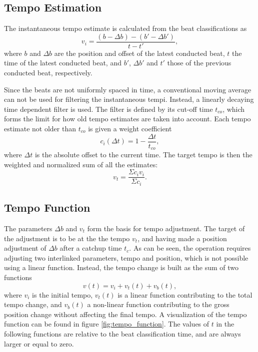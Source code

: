 \subsection{Tempo Estimation}

The instantaneous tempo estimate is calculated from
the beat classifications as
\begin{equation}
v_i = \frac{(b - \Delta b) - (b' - \Delta b')}{t - t'},
\end{equation}
where $b$ and $\Delta b$ are the position and offset of
the latest conducted beat,
$t$ the time of the latest conducted beat,
and $b'$, $\Delta b'$ and $t'$ those of
the previous conducted beat, respectively.

Since the beats are not uniformly spaced in time,
a conventional moving average can not be used
for filtering the instantaneous tempi.
Instead, a linearly decaying time dependent filter is used.
The filter is defined by its cut-off time $t_{co}$,
which forms the limit for how old tempo estimates
are taken into account.
Each tempo estimate not older than $t_{co}$ is given a weight coefficient
\begin{equation}
c_i(\Delta t) = 1 - \frac{\Delta t}{t_{co}},
\end{equation}
where $\Delta t$ is the absolute offset to the current time.
The target tempo is then the
weighted and normalized sum of all the estimates:
\begin{equation}
v_t = \frac{\Sigma c_i v_i}{\Sigma c_i}.
\end{equation}


\subsection{Tempo Function}
\label{sec:tempo_function}

The parameters $\Delta b$ and $v_t$
form the basis for tempo adjustment.
The target of the adjustment is to be
at the the tempo $v_t$,
and having made a position adjustment of $\Delta b$
after a catchup time $t_c$.
As can be seen,
the operation requires adjusting two interlinked parameters,
tempo and position,
which is not possible using a linear function.
Instead, the tempo change is built as the sum of two functions
\begin{equation}
v(t) = v_i + v_t(t) + v_b(t),
\end{equation}
where $v_i$ is the initial tempo,
$v_t(t)$ is a linear function
contributing to the total tempo change,
and $v_b(t)$ a non-linear function contributing
to the gross position change
without affecting the final tempo.
A visualization of the tempo function can be found
in figure \ref{fig:tempo_function}.
The values of $t$ in the following functions are relative to the
beat classification time,
and are always larger or equal to zero.

